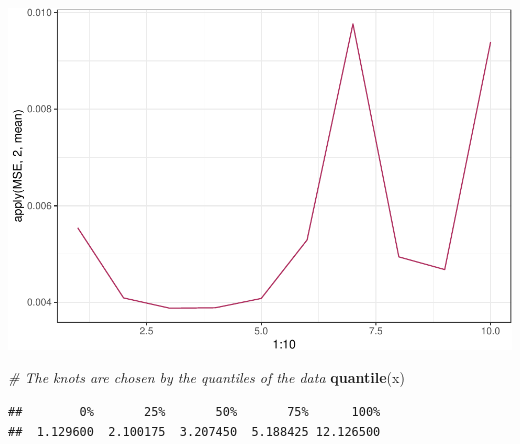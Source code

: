 \documentclass[]{article}
\newenvironment{Shaded}{\begin{snugshade}}{\end{snugshade}}
\newcommand{\KeywordTok}[1]{\textcolor[rgb]{0.13,0.29,0.53}{\textbf{#1}}}
\newcommand{\CommentTok}[1]{\textcolor[rgb]{0.56,0.35,0.01}{\textit{#1}}}
\newcommand{\NormalTok}[1]{#1}
\begin{document}
\includegraphics{hw7_files/figure-latex/unnamed-chunk-8-1.pdf}

\begin{Shaded}
\begin{Highlighting}[]
\CommentTok{# The knots are chosen by the quantiles of the data}
\KeywordTok{quantile}\NormalTok{(x)}
\end{Highlighting}
\end{Shaded}

\begin{verbatim}
##        0%       25%       50%       75%      100% 
##  1.129600  2.100175  3.207450  5.188425 12.126500
\end{verbatim}
\end{document}
